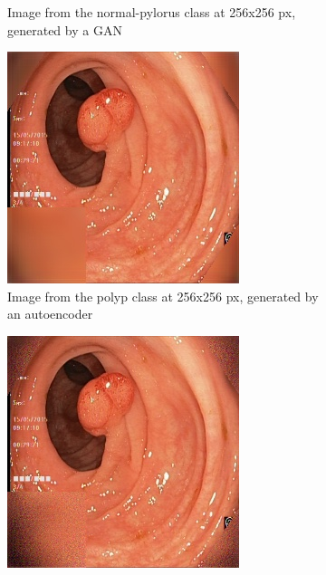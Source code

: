 \begin{figure}
\begin{subfigure}[t]{0.4\textwidth}
            \caption{Image from the normal-pylorus class at 256x256 px, generated by a GAN }    
            \label{fig:polypGAN}
        \end{subfigure}
        \qquad\vfill%
        \begin{subfigure}[t]{0.4\textwidth}   
            \centering 
            \includegraphics[width=\textwidth]{experiments/figures/both/PAE.jpg}
            \caption{Image from the polyp class at 256x256 px, generated by an autoencoder }    
            \label{fig:zAE}
        \end{subfigure}
        \qquad%
        \begin{subfigure}[t]{0.4\textwidth}   
            \centering 
            \includegraphics[width=\textwidth]{experiments/figures/both/PGAN.jpg}

\end{subfigure}
\end{figure}
